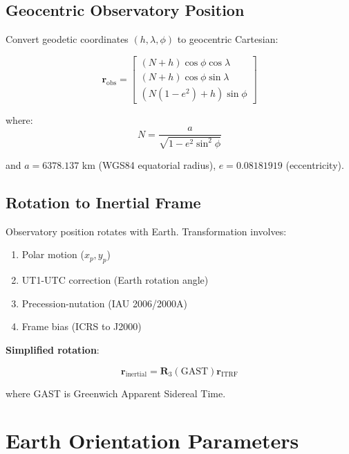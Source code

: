 \subsection{Geocentric Observatory Position}

Convert geodetic coordinates $(h, \lambda, \phi)$ to geocentric Cartesian:

\begin{equation}
    \mathbf{r}_{\text{obs}} = \begin{bmatrix}
        (N + h)\cos\phi\cos\lambda \\
        (N + h)\cos\phi\sin\lambda \\
        (N(1-e^2) + h)\sin\phi
    \end{bmatrix}
\end{equation}

where:
\begin{equation}
    N = \frac{a}{\sqrt{1 - e^2\sin^2\phi}}
\end{equation}

and $a = 6378.137$ km (WGS84 equatorial radius), $e = 0.08181919$ (eccentricity).

\subsection{Rotation to Inertial Frame}

Observatory position rotates with Earth. Transformation involves:

\begin{enumerate}
    \item Polar motion ($x_p, y_p$)
    \item UT1-UTC correction (Earth rotation angle)
    \item Precession-nutation (IAU 2006/2000A)
    \item Frame bias (ICRS to J2000)
\end{enumerate}

\textbf{Simplified rotation}:

\begin{equation}
    \mathbf{r}_{\text{inertial}} = \mathbf{R}_3(\text{GAST}) \mathbf{r}_{\text{ITRF}}
\end{equation}

where GAST is Greenwich Apparent Sidereal Time.

\section{Earth Orientation Parameters}

